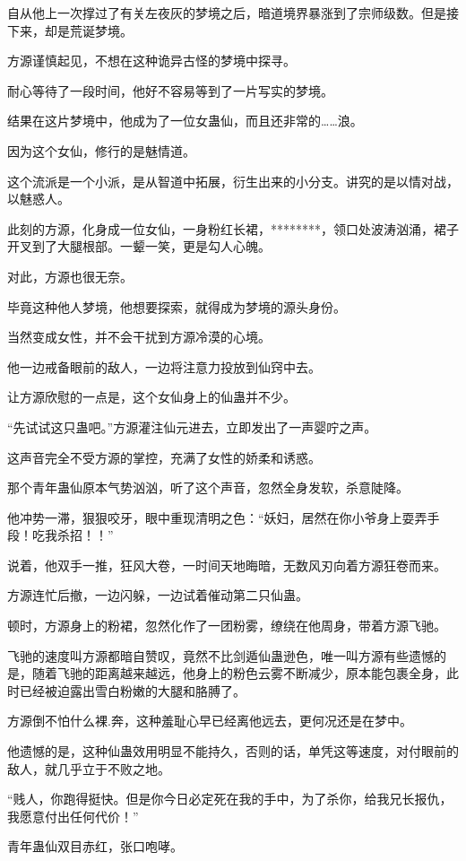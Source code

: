 \begin{this_body}
自从他上一次撑过了有关左夜灰的梦境之后，暗道境界暴涨到了宗师级数。但是接下来，却是荒诞梦境。

方源谨慎起见，不想在这种诡异古怪的梦境中探寻。

耐心等待了一段时间，他好不容易等到了一片写实的梦境。

结果在这片梦境中，他成为了一位女蛊仙，而且还非常的……浪。

因为这个女仙，修行的是魅情道。

这个流派是一个小派，是从智道中拓展，衍生出来的小分支。讲究的是以情对战，以魅惑人。

此刻的方源，化身成一位女仙，一身粉红长裙，********，领口处波涛汹涌，裙子开叉到了大腿根部。一颦一笑，更是勾人心魄。

对此，方源也很无奈。

毕竟这种他人梦境，他想要探索，就得成为梦境的源头身份。

当然变成女性，并不会干扰到方源冷漠的心境。

他一边戒备眼前的敌人，一边将注意力投放到仙窍中去。

让方源欣慰的一点是，这个女仙身上的仙蛊并不少。

“先试试这只蛊吧。”方源灌注仙元进去，立即发出了一声婴咛之声。

这声音完全不受方源的掌控，充满了女性的娇柔和诱惑。

那个青年蛊仙原本气势汹汹，听了这个声音，忽然全身发软，杀意陡降。

他冲势一滞，狠狠咬牙，眼中重现清明之色：“妖妇，居然在你小爷身上耍弄手段！吃我杀招！！”

说着，他双手一推，狂风大卷，一时间天地晦暗，无数风刃向着方源狂卷而来。

方源连忙后撤，一边闪躲，一边试着催动第二只仙蛊。

顿时，方源身上的粉裙，忽然化作了一团粉雾，缭绕在他周身，带着方源飞驰。

飞驰的速度叫方源都暗自赞叹，竟然不比剑遁仙蛊逊色，唯一叫方源有些遗憾的是，随着飞驰的距离越来越远，他身上的粉色云雾不断减少，原本能包裹全身，此时已经被迫露出雪白粉嫩的大腿和胳膊了。

方源倒不怕什么裸.奔，这种羞耻心早已经离他远去，更何况还是在梦中。

他遗憾的是，这种仙蛊效用明显不能持久，否则的话，单凭这等速度，对付眼前的敌人，就几乎立于不败之地。

“贱人，你跑得挺快。但是你今日必定死在我的手中，为了杀你，给我兄长报仇，我愿意付出任何代价！”

青年蛊仙双目赤红，张口咆哮。


\end{this_body}
